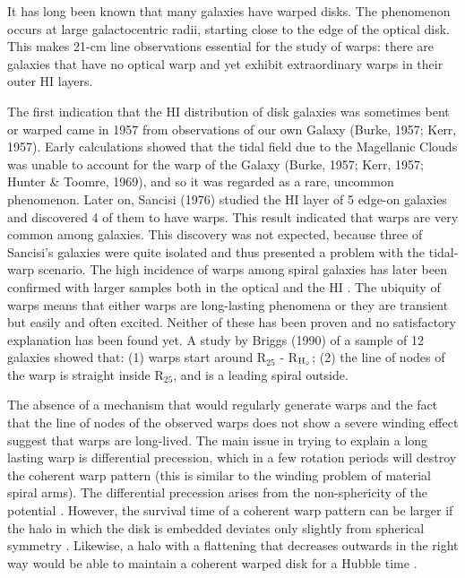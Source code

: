 \documentclass{aa}
\begin{document}
It has long been known that many galaxies have warped disks. The
phenomenon occurs at large 
galactocentric radii, starting close to the edge of the optical
disk. This makes 21-cm line observations essential for the study of
warps: there are galaxies that have no optical warp and yet 
exhibit extraordinary warps in their outer HI layers.

The first indication that the HI distribution of disk galaxies was
sometimes bent or warped came in 1957 from observations of our own
Galaxy (Burke, 1957; Kerr, 1957). Early calculations showed that the
tidal field due to the Magellanic
Clouds was unable to account for the warp of the Galaxy
(Burke, 1957; Kerr, 1957; Hunter \& Toomre, 1969), and so it was regarded as a rare, uncommon
phenome\-non. Later on, Sancisi (1976) studied the HI layer
of 5 edge-on galaxies and discovered 4 of them to have warps. This
result indicated that warps are very common among galaxies. This discovery 
was not expected, because three of Sancisi's galaxies were quite
isolated and thus 
presented a problem with the tidal-warp scenario. The high incidence
of warps among spiral galaxies has later been confirmed with larger
samples both in the optical \cite{ss,res} and the HI \cite{bosma}.
The ubiquity of
warps means that either warps are long-lasting
phenomena or they are transient but easily and often excited. Neither of these has been
proven and no satisfactory explanation has been found yet. A study by
Briggs (1990) of a sample of 12 galaxies showed that: (1) warps start around
R$_{25}$ - R$_{\rm H_\circ}$; (2) the line of nodes of the warp is straight
inside R$_{25}$, and is a leading spiral outside. 

The absence of a mechanism that would regularly generate warps and the
fact that the line of nodes of the observed warps does not show a
severe winding effect \cite{briggs} suggest that warps are long-lived.
The main issue in trying to explain a long lasting warp is
differential precession, which in a few rotation periods will 
destroy the coherent warp pattern (this is similar to the winding
problem of material spiral arms). The differential precession arises from the non-sphericity
of the potential \cite{avner}. However, the
survival time of a coherent warp pattern can be larger if the halo in which
the disk is embedded deviates only slightly from spherical symmetry
\cite{sanders}. Likewise, a halo with a flattening that decreases outwards in
the right way would be able to maintain a coherent warped disk
for a Hubble time \cite{petrou}.
\end{document}
